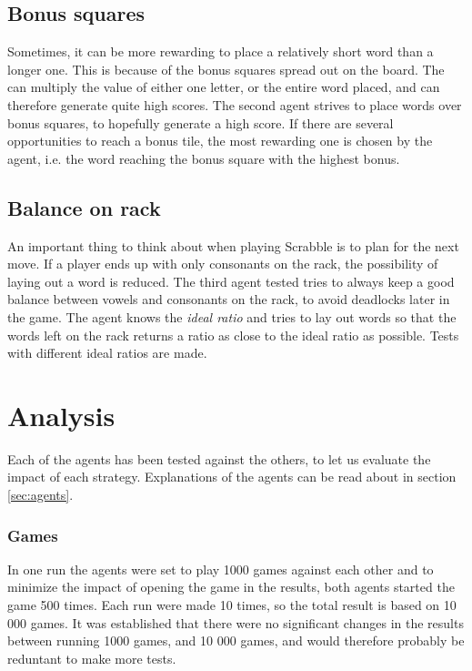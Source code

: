 \documentclass[a4paper, 12pt]{report}
\begin{document}
\subsection{Bonus squares}
Sometimes, it can be more rewarding to place a relatively short word than a longer one. This is because of the bonus squares spread out on the board. The can multiply the value of either one letter, or the entire word placed, and can therefore generate quite high scores. The second agent strives to place words over bonus squares, to hopefully generate a high score. If there are several opportunities to reach a bonus tile, the most rewarding one is chosen by the agent, i.e. the word reaching the bonus square with the highest bonus.

\subsection{Balance on rack}
An important thing to think about when playing Scrabble is to plan for the next move. If a player ends up with only consonants on the rack, the possibility of laying out a word is reduced. The third agent tested tries to always keep a good balance between vowels and consonants on the rack, to avoid deadlocks later in the game. The agent knows the \emph{ideal ratio} and tries to lay out words so that the words left on the rack returns a ratio as close to the ideal ratio as possible. Tests with different ideal ratios are made.

\section{Analysis}
\label{sec:analysis}
Each of the agents has been tested against the others, to let us evaluate the impact of each strategy. Explanations of the agents can be read about in section \ref{sec:agents}.
 
\subsubsection{Games}
In one run the agents were set to play 1000 games against each other and to minimize the impact of opening the game in the results, both agents started the game 500 times. Each run were made 10 times, so the total result is based on 10 000 games. It was established that there were no significant changes in the results between running 1000 games, and 10 000 games, and would therefore probably be reduntant to make more tests. 
\end{document}
